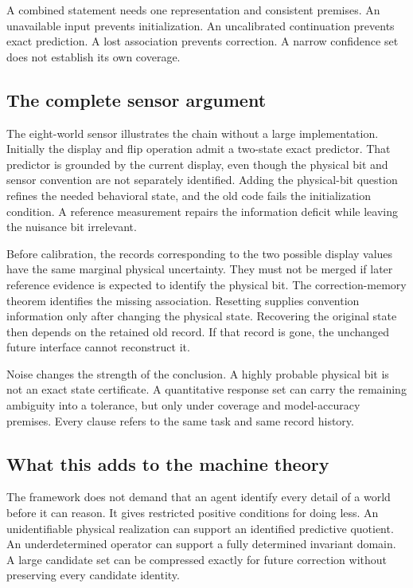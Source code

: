 A combined statement needs one representation and consistent premises. An unavailable input prevents initialization. An uncalibrated continuation prevents exact prediction. A lost association prevents correction. A narrow confidence set does not establish its own coverage.

\subsection{The complete sensor argument}
The eight-world sensor illustrates the chain without a large implementation. Initially the display and flip operation admit a two-state exact predictor. That predictor is grounded by the current display, even though the physical bit and sensor convention are not separately identified. Adding the physical-bit question refines the needed behavioral state, and the old code fails the initialization condition. A reference measurement repairs the information deficit while leaving the nuisance bit irrelevant.

Before calibration, the records corresponding to the two possible display values have the same marginal physical uncertainty. They must not be merged if later reference evidence is expected to identify the physical bit. The correction-memory theorem identifies the missing association. Resetting supplies convention information only after changing the physical state. Recovering the original state then depends on the retained old record. If that record is gone, the unchanged future interface cannot reconstruct it.

Noise changes the strength of the conclusion. A highly probable physical bit is not an exact state certificate. A quantitative response set can carry the remaining ambiguity into a tolerance, but only under coverage and model-accuracy premises. Every clause refers to the same task and same record history.

\subsection{What this adds to the machine theory}
The framework does not demand that an agent identify every detail of a world before it can reason. It gives restricted positive conditions for doing less. An unidentifiable physical realization can support an identified predictive quotient. An underdetermined operator can support a fully determined invariant domain. A large candidate set can be compressed exactly for future correction without preserving every candidate identity.


